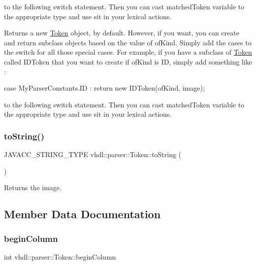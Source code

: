 to the following switch statement. Then you can cast matched\+Token variable to the appropriate type and use sit in your lexical actions.

Returns a new \mbox{\hyperlink{classvhdl_1_1parser_1_1_token}{Token}} object, by default. However, if you want, you can create and return subclass objects based on the value of of\+Kind. Simply add the cases to the switch for all those special cases. For example, if you have a subclass of \mbox{\hyperlink{classvhdl_1_1parser_1_1_token}{Token}} called I\+D\+Token that you want to create if of\+Kind is ID, simply add something like \+:

case My\+Parser\+Constants.\+ID \+: return new I\+D\+Token(of\+Kind, image);

to the following switch statement. Then you can cast matched\+Token variable to the appropriate type and use sit in your lexical actions. \mbox{\label{classvhdl_1_1parser_1_1_token_a1642fdaf589e2f0158e101d9a335d75a}} 
\subsubsection{\texorpdfstring{toString()}{toString()}}
{\footnotesize\ttfamily J\+A\+V\+A\+C\+C\+\_\+\+S\+T\+R\+I\+N\+G\+\_\+\+T\+Y\+PE vhdl\+::parser\+::\+Token\+::to\+String (\begin{DoxyParamCaption}{ }\end{DoxyParamCaption})}

Returns the image. 

\subsection{Member Data Documentation}
\mbox{\label{classvhdl_1_1parser_1_1_token_a6fc8fab679c3f9110cb17c520836d02c}} 
\subsubsection{\texorpdfstring{beginColumn}{beginColumn}}
{\footnotesize\ttfamily int vhdl\+::parser\+::\+Token\+::begin\+Column}

